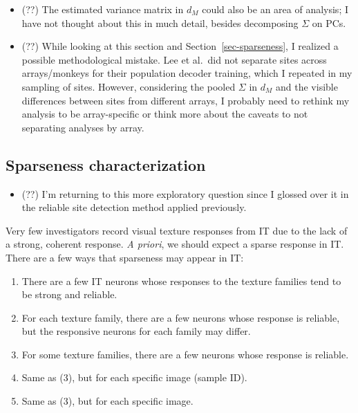 \documentclass[
  11pt,
  letterpaper,
  DIV=11,
  numbers=noendperiod]{scrartcl}
\providecommand{\tightlist}{%
  \setlength{\itemsep}{0pt}\setlength{\parskip}{0pt}}
\begin{document}
\begin{itemize}
\tightlist
\item
  (??) The estimated variance matrix in \(d_M\) could also be an area of
  analysis; I have not thought about this in much detail, besides
  decomposing \(\Sigma\) on PCs.
\item
  (??) While looking at this section and Section~\ref{sec-sparseness}, I
  realized a possible methodological mistake. Lee et al.~did not
  separate sites across arrays/monkeys for their population decoder
  training, which I repeated in my sampling of sites. However,
  considering the pooled \(\Sigma\) in \(d_M\) and the visible
  differences between sites from different arrays, I probably need to
  rethink my analysis to be array-specific or think more about the
  caveats to not separating analyses by array.
\end{itemize}

\subsection{Sparseness
characterization}\label{sparseness-characterization}

\begin{itemize}
\tightlist
\item
  (??) I'm returning to this more exploratory question since I glossed
  over it in the reliable site detection method applied previously.
\end{itemize}

Very few investigators record visual texture responses from IT due to
the lack of a strong, coherent response. \emph{A priori}, we should
expect a sparse response in IT. There are a few ways that sparseness may
appear in IT:

\begin{enumerate}
\def\labelenumi{\arabic{enumi}.}
\tightlist
\item
  There are a few IT neurons whose responses to the texture families
  tend to be strong and reliable.
\item
  For each texture family, there are a few neurons whose response is
  reliable, but the responsive neurons for each family may differ.
\item
  For some texture families, there are a few neurons whose response is
  reliable.
\item
  Same as (3), but for each specific image (sample ID).
\item
  Same as (3), but for each specific image.
\end{enumerate}
\end{document}
